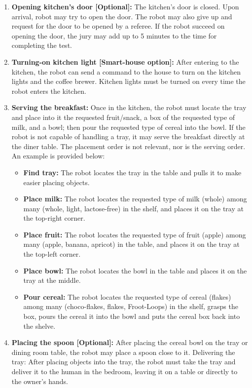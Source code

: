 \begin{enumerate}
	\item \textbf{Opening kitchen's door [Optional]:} The kitchen's door is closed. Upon arrival, robot may try to open the door. The robot may also give up and request for the door to be opened by a referee. If the robot succeed on opening the door, the jury may add up to 5 minutes to the time for completing the test.

	\item \textbf{Turning-on kitchen light [Smart-house option]:} After entering to the kitchen, the robot can send a command to the house to turn on the kitchen lights and the coffee brewer. Kitchen lights must be turned on every time the robot enters the kitchen.

	\item \textbf{Serving the breakfast:} Once in the kitchen, the robot must locate the tray and place into it the requested fruit/snack, a box of the requested type of milk, and a bowl; then pour the requested type of cereal into the bowl. If the robot is not capable of handling a tray, it may serve the breakfast directly at the diner table. The placement order is not relevant, nor is the serving order. An example is provided below:
	\begin{itemize}
		\item \textbf{Find tray:} The robot locates the tray in the table and pulls it to make easier placing objects.
		\item \textbf{Place milk:} The robot locates the requested type of milk (whole) among many (whole, light, lactose-free) in the shelf, and places it on the tray at the top-right corner.
		\item \textbf{Place fruit:} The robot locates the requested type of fruit (apple) among many (apple, banana, apricot) in the table, and places it on the tray at the top-left corner.
		\item \textbf{Place bowl:} The robot locates the bowl in the table and places it on the tray at the middle.
		\item \textbf{Pour cereal:} The robot locates the requested type of cereal (flakes) among many (choco-flakes, flakes, Froot-Loops) in the shelf, grasps the box, pours the cereal it into the bowl and puts the cereal box back into the shelve.
	\end{itemize}

	\item \textbf{Placing the spoon [Optional]:} After placing the cereal bowl on the tray or dining room table, the robot may place a spoon close to it.
	Delivering the tray: After placing objects into the tray, the robot must take the tray and deliver it to the human in the bedroom, leaving it on a table or directly to the owner's hands.


\end{enumerate}
